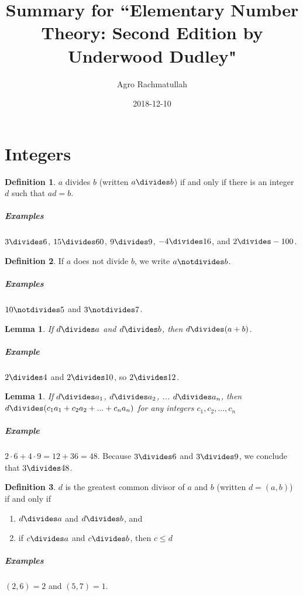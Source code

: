 \documentclass{article}
\title{Summary for ``Elementary Number Theory: Second Edition by Underwood Dudley"}
\date{2018-12-10}
\author{Agro Rachmatullah}
\newtheorem{lemma}[theorem]{Lemma}
\theoremstyle{definition}
\newtheorem{definition}{Definition}[section]
\begin{document}
  \maketitle
  
  \newpage
  \section{Integers}
  
  \begin{definition}
  $a$ divides $b$ (written $a \divides b$) if and only if there is an integer $d$ such that $ad = b$.
  
  \subparagraph{Examples} $3 \divides 6$, $15 \divides 60$, $9 \divides 9$, $-4 \divides 16$, and $2 \divides -100$.
  \end{definition}
  
  \begin{definition}
  If $a$ does not divide $b$, we write $a \notdivides b$.
  
  \subparagraph{Examples} $10 \notdivides 5$ and $3 \notdivides 7$.
  \end{definition}
  
  \begin{lemma}
    If $d \divides a$ and $d \divides b$, then $d \divides (a + b)$.
  \end{lemma}
  
  \subparagraph{Example} $2 \divides 4$ and $2 \divides 10$, so $2 \divides 12$.
  
  \begin{lemma}
    If $d \divides a_1$, $d \divides a_2$, ... $d \divides a_n$, then $d \divides (c_1a_1 + c_2a_2 + ... + c_na_n)$ for any integers $c_1, c_2, ..., c_n$
  \end{lemma}
  
  \subparagraph{Example} $2 \cdot 6 + 4 \cdot 9 = 12 + 36 = 48$. Because $3 \divides 6$ and $3 \divides 9$, we conclude that $3 \divides 48$.
  
  \begin{definition}
    $d$ is the greatest common divisor of $a$ and $b$ (written $d = (a, b)$) if and only if
    
    \begin{enumerate}[label=(\roman*)]
      \item $d \divides a$ and $d \divides b$, and
    
      \item if $c \divides a$ and $c \divides b$, then $c \le d$
    \end{enumerate}
  \end{definition}
  
  \subparagraph{Examples} $(2, 6) = 2$ and $(5, 7) = 1$.
\end{document}
